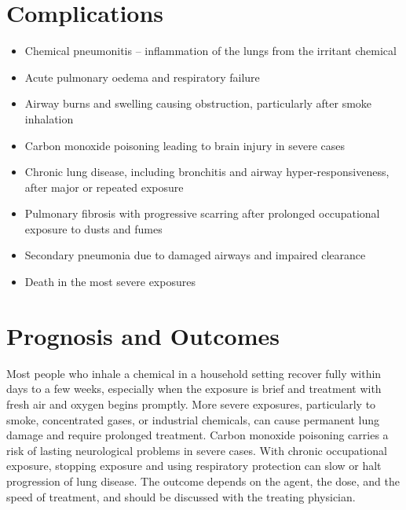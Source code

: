 \section*{Complications}
\begin{itemize}
    \item Chemical pneumonitis -- inflammation of the lungs from the irritant chemical
    \item Acute pulmonary oedema and respiratory failure
    \item Airway burns and swelling causing obstruction, particularly after smoke inhalation
    \item Carbon monoxide poisoning leading to brain injury in severe cases
    \item Chronic lung disease, including bronchitis and airway hyper-responsiveness, after major or repeated exposure
    \item Pulmonary fibrosis with progressive scarring after prolonged occupational exposure to dusts and fumes
    \item Secondary pneumonia due to damaged airways and impaired clearance
    \item Death in the most severe exposures
\end{itemize}

\section*{Prognosis and Outcomes}
Most people who inhale a chemical in a household setting recover fully within days to a few weeks, especially when the exposure is brief and treatment with fresh air and oxygen begins promptly. More severe exposures, particularly to smoke, concentrated gases, or industrial chemicals, can cause permanent lung damage and require prolonged treatment. Carbon monoxide poisoning carries a risk of lasting neurological problems in severe cases. With chronic occupational exposure, stopping exposure and using respiratory protection can slow or halt progression of lung disease. The outcome depends on the agent, the dose, and the speed of treatment, and should be discussed with the treating physician.

